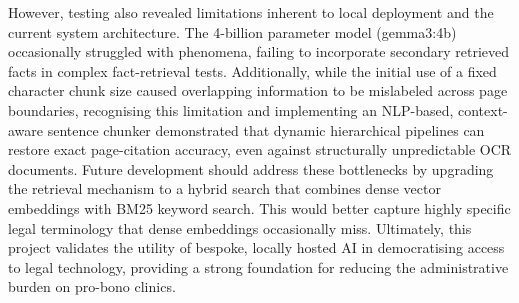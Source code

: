 \documentclass[11pt,a4paper]{article}
\begin{document}
However, testing also revealed limitations inherent to local deployment and the current system architecture. The 4-billion parameter model (gemma3:4b) occasionally struggled with  phenomena, failing to incorporate secondary retrieved facts in complex fact-retrieval tests. Additionally, while the initial use of a fixed character chunk size caused overlapping information to be mislabeled across page boundaries, recognising this limitation and implementing an NLP-based, context-aware sentence chunker demonstrated that dynamic hierarchical pipelines can restore exact page-citation accuracy, even against structurally unpredictable OCR documents. Future development should address these bottlenecks by upgrading the retrieval mechanism to a hybrid search that combines dense vector embeddings with BM25 keyword search. This would better capture highly specific legal terminology that dense embeddings occasionally miss. Ultimately, this project validates the utility of bespoke, locally hosted AI in democratising access to legal technology, providing a strong foundation for reducing the administrative burden on pro-bono clinics.


\end{document}
